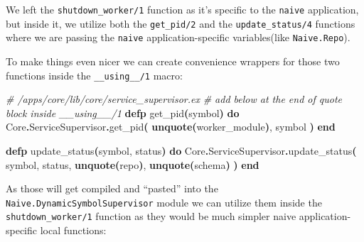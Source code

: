 \documentclass[
  oneside]{book}
\newenvironment{Shaded}{\begin{snugshade}}{\end{snugshade}}
\newcommand{\CommentTok}[1]{\textcolor[rgb]{0.56,0.35,0.01}{\textit{#1}}}
\newcommand{\ConstantTok}[1]{\textcolor[rgb]{0.56,0.35,0.01}{#1}}
\newcommand{\FunctionTok}[1]{\textcolor[rgb]{0.13,0.29,0.53}{\textbf{#1}}}
\newcommand{\KeywordTok}[1]{\textcolor[rgb]{0.13,0.29,0.53}{\textbf{#1}}}
\newcommand{\NormalTok}[1]{#1}
\newcommand{\OperatorTok}[1]{\textcolor[rgb]{0.81,0.36,0.00}{\textbf{#1}}}
\begin{document}
We left the \texttt{shutdown\_worker/1} function as it's specific to the \texttt{naive} application, but inside it, we utilize both the \texttt{get\_pid/2} and the \texttt{update\_status/4} functions where we are passing the \texttt{naive} application-specific variables(like \texttt{Naive.Repo}).

To make things even nicer we can create convenience wrappers for those two functions inside the \texttt{\_\_using\_\_/1} macro:

\begin{Shaded}
\begin{Highlighting}[]
      \CommentTok{\# /apps/core/lib/core/service\_supervisor.ex}
      \CommentTok{\# add below at the end of \textasciigrave{}quote\textasciigrave{} block inside \textasciigrave{}\_\_using\_\_/1\textasciigrave{}}
      \KeywordTok{defp}\NormalTok{ get\_pid}\FunctionTok{(}\NormalTok{symbol}\FunctionTok{)} \KeywordTok{do}
        \ConstantTok{Core}\OperatorTok{.}\ConstantTok{ServiceSupervisor}\OperatorTok{.}\NormalTok{get\_pid}\FunctionTok{(}
          \KeywordTok{unquote}\FunctionTok{(}\NormalTok{worker\_module}\FunctionTok{)}\NormalTok{,}
\NormalTok{          symbol}
        \FunctionTok{)}
      \KeywordTok{end}

      \KeywordTok{defp}\NormalTok{ update\_status}\FunctionTok{(}\NormalTok{symbol, status}\FunctionTok{)} \KeywordTok{do}
        \ConstantTok{Core}\OperatorTok{.}\ConstantTok{ServiceSupervisor}\OperatorTok{.}\NormalTok{update\_status}\FunctionTok{(}
\NormalTok{          symbol,}
\NormalTok{          status,}
          \KeywordTok{unquote}\FunctionTok{(}\NormalTok{repo}\FunctionTok{)}\NormalTok{,}
          \KeywordTok{unquote}\FunctionTok{(}\NormalTok{schema}\FunctionTok{)}
        \FunctionTok{)}
      \KeywordTok{end}
\end{Highlighting}
\end{Shaded}

As those will get compiled and ``pasted'' into the \texttt{Naive.DynamicSymbolSupervisor} module we can utilize them inside the \texttt{shutdown\_worker/1} function as they would be much simpler naive application-specific local functions:
\end{document}
